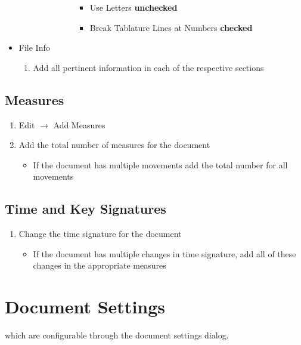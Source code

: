 \documentclass[unicode,hyperfootnotes=false,xetex,colorlinks=true,nofonts,nobib]{tufte-book} %
\begin{document}
\begin{itemize}
\begin{enumerate}
\begin{enumerate}
\begin{enumerate}
\begin{enumerate}
          \begin{itemize}
          \item Use Letters \textbf{unchecked}
          \item Break Tablature Lines at Numbers \textbf{checked}
          \end{itemize}
        \end{enumerate}
      \end{enumerate}
    \end{enumerate}
  \end{enumerate}
\item File Info
  \begin{enumerate}
  \item Add all pertinent information in each of the respective sections 
  \end{enumerate}
\end{itemize}

\section{Measures}
\label{sec:measures}

\begin{enumerate}
\item Edit $\rightarrow$ Add Measures
\item Add the total number of measures for the document
  \begin{itemize}
  \item If the document has multiple movements add the total number for all movements
  \end{itemize}
\end{enumerate}

\section{Time and Key Signatures}
\label{sec:time-key-signatures}

\begin{enumerate}
\item Change the time signature for the document
  \begin{itemize}
  \item If the document has multiple changes in time signature, add all of these changes in the appropriate measures
  \end{itemize}
\end{enumerate}

\chapter{Document Settings}
 which are configurable through the
document settings dialog.
\end{document}
